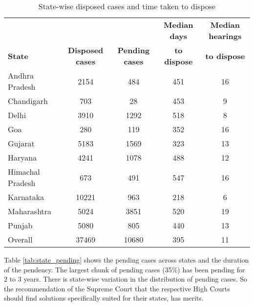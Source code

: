 \documentclass[12pt,a4paper]{article}
\begin{document}
		\begin{table}[!ht]
			\caption{State-wise disposed cases and time taken to dispose}\label{tab:state_disposal}
			\centering
			\footnotesize	
			\begin{tabular}{lcccc}
				\toprule
				& & & \textbf{Median days} & \textbf{Median hearings} \\
				\textbf{State} & \textbf{Disposed cases} & \textbf{Pending cases} & \textbf{to dispose} & \textbf{to dispose} \\
				\midrule
				Andhra Pradesh & 2154 & 484 & 451 & 16 \\
				Chandigarh & 703 & 28 & 453 & 9 \\
				Delhi & 3910 & 1292 & 518 & 8 \\
				Goa & 280 & 119 & 352 & 16 \\
				Gujarat & 5183 & 1569 & 323 & 13 \\
				Haryana & 4241 & 1078 & 488 & 12 \\
				Himachal Pradesh & 673 & 491 & 547 & 16 \\
				Karnataka & 10221 & 963 & 218 & 6 \\
				Maharashtra & 5024 & 3851 & 520 & 19 \\
				Punjab & 5080 & 805 & 440 & 13 \\
				\midrule
				Overall & 37469 & 10680 & 395 & 11 \\
				\bottomrule
			\end{tabular}
		\end{table}
		
		Table \ref{tab:state_pending} shows the pending cases across states and the duration of the pendency. The largest chunk of pending cases (35\%) has been pending for 2 to 3 years. There is state-wise variation in the distribution of pending cases. So the recommendation of the Supreme Court that the respective High Courts should find solutions specifically suited for their states, has merits.
		
\end{document}

